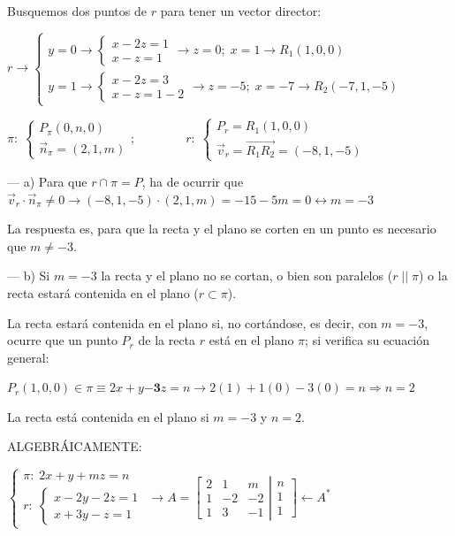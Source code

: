 \begin{proofw}\renewcommand{\qedsymbol}{$\diamond$}
	Busquemos dos puntos de $r$ para tener un vector director:
	
\noindent $r\to\begin{cases}
 y=0 \to \begin{cases} x-2z=1\\x-z=1	 \end{cases} \to z=0;\; x=1 \to R_1(1,0,0)\\
 y=1 \to \begin{cases} x-2z=3\\x-z=1-2 \end{cases} \to z=-5;\; x=-7 \to R_2(-7,1,-5)
 \end{cases}$
 
 \noindent$\pi:\;\begin{cases} P_{\pi}(0,n,0) \\ \vec n_{\pi}=(2,1,m) \end{cases}; \qquad \qquad r:\; \begin{cases} P_r=R_1(1,0,0) \\ \vec v_r=\overrightarrow{R_1R_2}=(-8,1,-5) \end{cases}$

\noindent --- a) Para que $r\cap \pi=P$, ha de ocurrir que $\vec v_r \cdot \vec n_{\pi}\neq 0 \to (-8,1,-5)\cdot(2,1,m)=-15-5m=0 \leftrightarrow m=-3$

\noindent La respuesta es, para que la recta y el plano se corten en un punto es necesario que $m\neq -3$.

\noindent --- b) Si $m=-3$ la recta y el plano no se cortan, o bien son paralelos ($r\;||\; \pi$) o la recta estará contenida en el plano ($r\subset \pi$).

\noindent La recta estará contenida en el plano si, no cortándose, es decir, con $m=-3$, ocurre que un punto $P_r$ de la recta $r$ está en el plano $\pi$; si verifica su ecuación general:

\noindent $P_r(1,0,0) \in \pi \equiv 2x+y\boldsymbol{-3}z=n \to 2(1)+1(0)-3(0)=n \Rightarrow n=2$

\noindent La recta está contenida en el plano si $m=-3$ y $n=2$.


 ALGEBRÁICAMENTE:
 
 \noindent $\begin{cases} \pi:\; 2x+y+mz=n \\
r:\; \begin{cases} x-2y-2z=1\\x+3y-z=1 \end{cases}
\end{cases}  \to A=\left[ \begin{matrix} 2&1&m\\1&-2&-2\\1&3&-1 \end{matrix} \right. \left| \begin{matrix} n\\1\\1 \end{matrix} \right] \leftarrow A^*$


\end{proofw}
